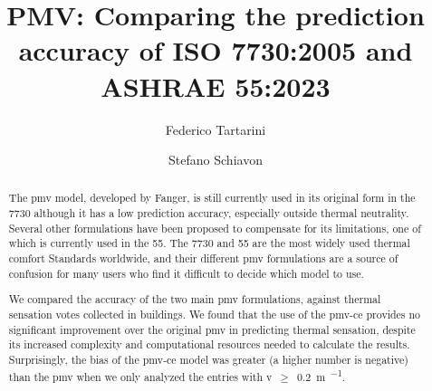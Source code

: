 \begin{frontmatter}

    \title{PMV: Comparing the prediction accuracy of ISO 7730:2005 and ASHRAE 55:2023}

    \author[label1,label2]{Federico Tartarini}
    \author[label3]{Stefano Schiavon}

    \address[label1]{Berkeley Education Alliance for Research in Singapore, Singapore}
    \address[label2]{Heat and Health Research Incubator, Faculty of Health and Medicine, University of Sydney, Sydney, AU}
    \address[label3]{Center for the Built Environment, University of California, Berkeley, CA, USA}


    \begin{abstract}

        The \ac{pmv} model, developed by Fanger, is still currently used in its original form in the \gls{7730} although it has a low prediction accuracy, especially outside thermal neutrality.
        Several other formulations have been proposed to compensate for its limitations, one of which is currently used in the \gls{55}.
        The \gls{7730} and \gls{55} are the most widely used thermal comfort Standards worldwide, and their different \ac{pmv} formulations are a source of confusion for many users who find it difficult to decide which model to use.

        We compared the accuracy of the two main \ac{pmv} formulations, against  thermal sensation votes collected in buildings.
        We found that the use of the \ac{pmv-ce} provides no significant improvement over the original \ac{pmv} in predicting thermal sensation, despite its increased complexity and computational resources needed to calculate the results.
        Surprisingly, the bias of the \ac{pmv-ce} model was greater (a higher number is negative) than the \ac{pmv} when we only analyzed the entries with \ac{v}~$\geq$~\qty{0.2}{\m\per\sec}.


\end{abstract}
\end{frontmatter}
